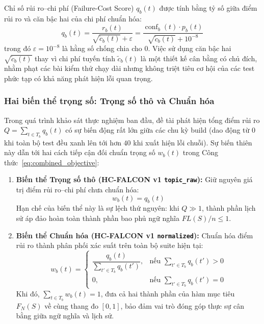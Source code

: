 Chỉ số rủi ro--chi phí (Failure-Cost Score) $q_b(t)$ được tính bằng tỷ số giữa điểm rủi ro và căn bậc hai của chi phí chuẩn hóa:
\begin{equation}
\label{eq:q_score}
q_b(t) = \frac{r_b(t)}{\sqrt{\widetilde{c}_b(t)} + \varepsilon} = \frac{\operatorname{conf}_b(t) \cdot p_b(t)}{\sqrt{\widetilde{c}_b(t)} + 10^{-8}}
\end{equation}
trong đó $\varepsilon = 10^{-8}$ là hằng số chống chia cho $0$. Việc sử dụng căn bậc hai $\sqrt{\widetilde{c}_b(t)}$ thay vì chi phí tuyến tính $\widetilde{c}_b(t)$ là một thiết kế cân bằng có chủ đích, nhằm phạt các bài kiểm thử chạy dài nhưng không triệt tiêu cơ hội của các test phức tạp có khả năng phát hiện lỗi quan trọng.

\subsubsection{Hai biến thể trọng số: Trọng số thô và Chuẩn hóa}
\label{subsubsec:raw_vs_normalized}

Trong quá trình khảo sát thực nghiệm ban đầu, đề tài phát hiện tổng điểm rủi ro $Q = \sum_{t \in T_b} q_b(t)$ có sự biến động rất lớn giữa các chu kỳ build (dao động từ $0$ khi toàn bộ test đều xanh lên tới hơn $40$ khi xuất hiện lỗi chuỗi). Sự biến thiên này dẫn tới hai cách tiếp cận đối chuẩn trọng số $w_b(t)$ trong Công thức~\eqref{eq:combined_objective}:

\begin{enumerate}
    \item \textbf{Biến thể Trọng số thô (HC-FALCON v1 \texttt{topic\_raw}):}
    Giữ nguyên giá trị điểm rủi ro--chi phí chưa chuẩn hóa:
    \begin{equation}
    \label{eq:weight_raw}
    w_b(t) = q_b(t)
    \end{equation}
    Hạn chế của biến thể này là sự lệch thứ nguyên: khi $Q \gg 1$, thành phần lịch sử áp đảo hoàn toàn thành phần bao phủ ngữ nghĩa $FL(S)/n \le 1$.
    
    \item \textbf{Biến thể Chuẩn hóa (HC-FALCON v1 \texttt{normalized}):}
    Chuẩn hóa điểm rủi ro thành phân phối xác suất trên toàn bộ suite hiện tại:
    \begin{equation}
    \label{eq:weight_normalized}
    w_b(t) = \begin{cases}
    \dfrac{q_b(t)}{\sum_{t' \in T_b} q_b(t')}, & \text{nếu } \sum_{t' \in T_b} q_b(t') > 0 \\
    0, & \text{nếu } \sum_{t' \in T_b} q_b(t') = 0
    \end{cases}
    \end{equation}
    Khi đó, $\sum_{t \in T_b} w_b(t) = 1$, đưa cả hai thành phần của hàm mục tiêu $F_N(S)$ về cùng thang đo $[0, 1]$, bảo đảm vai trò đóng góp thực sự cân bằng giữa ngữ nghĩa và lịch sử.
\end{enumerate}

